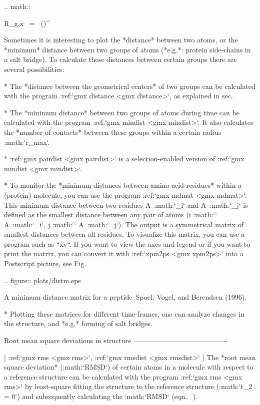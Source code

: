  .. math::

     R_{g,x} ~=~ \left({}\right)^{{}}
     \label{eqn:rgaxis}

Sometimes it is interesting to plot the *distance* between two atoms, or
the *minimum* distance between two groups of atoms (*e.g.*: protein
side-chains in a salt bridge). To calculate these distances between
certain groups there are several possibilities:

*   The *distance between the geometrical centers* of two groups can be
    calculated with the program
    :ref:`gmx distance <gmx distance>`, as
    explained in sec. 

*   The *minimum distance* between two groups of atoms during time can
    be calculated with the program :ref:`gmx mindist <gmx mindist>`. It also calculates the
    *number of contacts* between these groups within a certain radius
    :math:`r_{max}`.

*   :ref:`gmx pairdist <gmx pairdist>` is a
    selection-enabled version of :ref:`gmx mindist <gmx mindist>`.

*   To monitor the *minimum distances between amino acid residues*
    within a (protein) molecule, you can use the program
    :ref:`gmx mdmat <gmx mdmat>`. This
    minimum distance between two residues A\ :math:`_i` and
    A\ :math:`_j` is defined as the smallest distance between any pair
    of atoms (i :math:`\in` A\ :math:`_i`, j :math:`\in` A\ :math:`_j`).
    The output is a symmetrical matrix of smallest distances between all
    residues. To visualize this matrix, you can use a program such as
    ``xv``. If you want to view the axes and legend or if
    you want to print the matrix, you can convert it with
    :ref:`xpm2ps <gmx xpm2ps>` into a Postscript picture, see
    Fig. 

    .. figure:: plots/distm.eps

       A minimum distance matrix for a
       peptide Spoel, Vogel, and Berendsen (1996).

*   Plotting these matrices for different time-frames, one can analyze
    changes in the structure, and *e.g.* forming of salt bridges.

Root mean square deviations in structure
----------------------------------------

| :ref:`gmx rms <gmx rms>`, :ref:`gmx rmsdist <gmx rmsdist>`
| The *root mean square deviation* (:math:`RMSD`) of certain atoms in a
  molecule with respect to a reference structure can be calculated with
  the program :ref:`gmx rms <gmx rms>` by
  least-square fitting the structure to the reference structure
  (:math:`t_2 = 0`) and subsequently calculating the :math:`RMSD`
  (eqn. 
  ).

